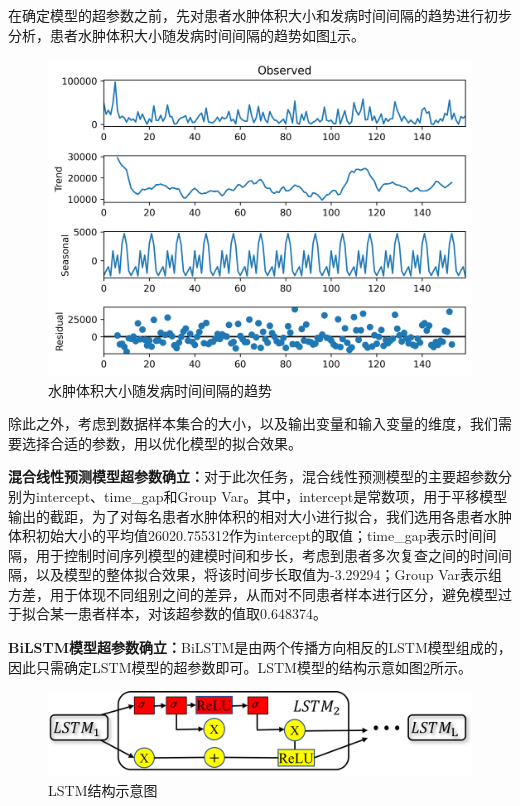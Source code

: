 \documentclass[bwprint]{gmcmthesis}
\begin{document}
在确定模型的超参数之前，先对患者水肿体积大小和发病时间间隔的趋势进行初步分析，患者水肿体积大小随发病时间间隔的趋势如图\ref{fig:水肿体积大小趋势}示。
\begin{figure}[h]
    \centering
    \includegraphics[width = \linewidth]{figures/seasonal_decompose.png}
    \caption{水肿体积大小随发病时间间隔的趋势}
    \label{fig:水肿体积大小趋势}
\end{figure}

除此之外，考虑到数据样本集合的大小，以及输出变量和输入变量的维度，我们需要选择合适的参数，用以优化模型的拟合效果。


{\bf 混合线性预测模型超参数确立：}对于此次任务，混合线性预测模型的主要超参数分别为intercept、time\_gap和Group Var。其中，intercept是常数项，用于平移模型输出的截距，为了对每名患者水肿体积的相对大小进行拟合，我们选用各患者水肿体积初始大小的平均值26020.755312作为intercept的取值；time\_gap表示时间间隔，用于控制时间序列模型的建模时间和步长，考虑到患者多次复查之间的时间间隔，以及模型的整体拟合效果，将该时间步长取值为-3.29294；Group Var表示组方差，用于体现不同组别之间的差异，从而对不同患者样本进行区分，避免模型过于拟合某一患者样本，对该超参数的值取0.648374。\par\par

{\bf BiLSTM模型超参数确立：}BiLSTM是由两个传播方向相反的LSTM模型组成的，因此只需确定LSTM模型的超参数即可。LSTM模型的结构示意如图\ref{fig:LSTM结构示意}所示。
\begin{figure}[h]
    \centering
    \includegraphics[width = \linewidth]{figures/LSTM结构示意.png}
    \caption{LSTM结构示意图}
    \label{fig:LSTM结构示意}
\end{figure}
\end{document}
